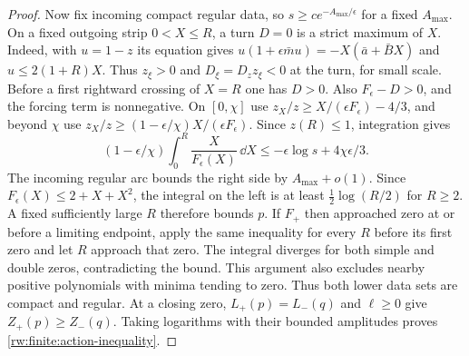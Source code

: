 \begin{proof}
Now fix incoming compact regular data, so
$s\ge ce^{-A_{\max}/\epsilon}$ for a fixed $A_{\max}$.
On a fixed outgoing strip $0<X\le R$, a turn $D=0$ is a strict
maximum of $X$. Indeed, with $u=1-z$ its equation gives
$u(1+\epsilon\bar m u)=-X(\bar a+\bar BX)$ and
$u\le2(1+R)X$. Thus $z_\xi>0$ and $D_\xi=D_z z_\xi<0$
at the turn, for small scale. Before a first rightward crossing of
$X=R$ one has $D>0$. Also $F_\epsilon-D>0$, and the forcing
term is nonnegative. On $[0,\chi]$ use
$z_X/z\ge X/(\epsilon F_\epsilon)-4/3$, and beyond $\chi$ use
$z_X/z\ge(1-\epsilon/\chi)X/(\epsilon F_\epsilon)$.
Since $z(R)\le1$, integration gives
\begin{equation}\label{rw:finite:action-budget}
 (1-\epsilon/\chi)\int_0^R\frac{X}{F_\epsilon(X)}\,\dd X
       \le-\epsilon\log s+4\chi\epsilon/3.
\end{equation}
The incoming regular arc bounds the right side by $A_{\max}+o(1)$.
Since $F_\epsilon(X)\le2+X+X^2$, the integral on the left is at
least $\frac12\log(R/2)$ for $R\ge2$. A fixed sufficiently large $R$
therefore bounds $p$.
If $F_+$ then approached zero at or before a limiting endpoint,
apply the same inequality for every $R$ before its first zero and
let $R$ approach that zero. The integral diverges for both simple
and double zeros, contradicting the bound. This argument also
excludes nearby positive polynomials with minima tending to zero.
Thus both lower data sets are compact and regular. At a closing zero,
$L_+(p)=L_-(q)$ and $\ell\ge0$ give $Z_+(p)\ge Z_-(q)$.
Taking logarithms with their bounded amplitudes proves
\eqref{rw:finite:action-inequality}.
\end{proof}

